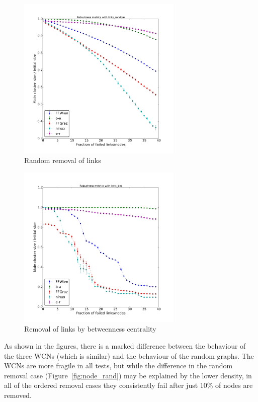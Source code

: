 \documentclass[a4paper,11pt,twoside,openright]{memoir}
\newcommand{\figref}[1] {Figure~\ref{#1}}
\begin{document}
\begin{figure}[htbp]
\centering
\includegraphics[width=0.7\textwidth]{graphs/links_random_robustness}
\caption{Random removal of links}
\label{fig:link_rand}
\end{figure}

\begin{figure}[htbp]
\centering
\includegraphics[width=0.7\textwidth]{graphs/links_bet_robustness}
\caption{Removal of links by betweenness centrality}
\label{fig:link_bet}
\end{figure}

As shown in the figures, there is a marked difference between the
behaviour of the three WCNs (which is similar) and the behaviour of the
random graphs. The WCNs are more fragile in all tests, but while the
difference in the random removal case (\figref{fig:node_rand}) may be
explained by the lower density, in all of the ordered removal cases they
consistently fail after just 10\% of nodes are removed.
\end{document}
